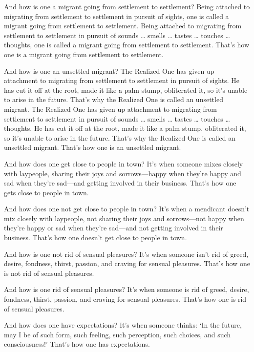 \documentclass[12pt,openany]{book}%
\begin{document}
And how is one a migrant going from settlement to settlement? Being attached to migrating from settlement to settlement in pursuit of sights, one is called a migrant going from settlement to settlement. Being attached to migrating from settlement to settlement in pursuit of sounds … smells … tastes … touches … thoughts, one is called a migrant going from settlement to settlement. That’s how one is a migrant going from settlement to settlement. 

And how is one an unsettled migrant? The Realized One has given up attachment to migrating from settlement to settlement in pursuit of sights. He has cut it off at the root, made it like a palm stump, obliterated it, so it’s unable to arise in the future. That’s why the Realized One is called an unsettled migrant. The Realized One has given up attachment to migrating from settlement to settlement in pursuit of sounds … smells … tastes … touches … thoughts. He has cut it off at the root, made it like a palm stump, obliterated it, so it’s unable to arise in the future. That’s why the Realized One is called an unsettled migrant. That’s how one is an unsettled migrant. 

And how does one get close to people in town? It’s when someone mixes closely with laypeople, sharing their joys and sorrows—happy when they’re happy and sad when they’re sad—and getting involved in their business. That’s how one gets close to people in town. 

And how does one not get close to people in town? It’s when a mendicant doesn’t mix closely with laypeople, not sharing their joys and sorrows—not happy when they’re happy or sad when they’re sad—and not getting involved in their business. That’s how one doesn’t get close to people in town. 

And how is one not rid of sensual pleasures? It’s when someone isn’t rid of greed, desire, fondness, thirst, passion, and craving for sensual pleasures. That’s how one is not rid of sensual pleasures. 

And how is one rid of sensual pleasures? It’s when someone is rid of greed, desire, fondness, thirst, passion, and craving for sensual pleasures. That’s how one is rid of sensual pleasures. 

And how does one have expectations? It’s when someone thinks: ‘In the future, may I be of such form, such feeling, such perception, such choices, and such consciousness!’ That’s how one has expectations. 
\end{document}
